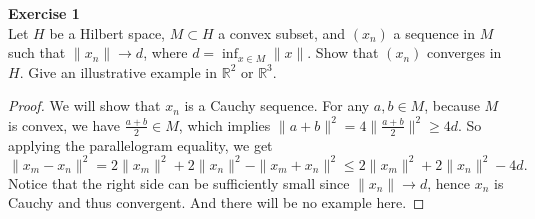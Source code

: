 \documentclass[12pt, a4paper]{article}
\theoremstyle{plain}
\newcommand{\R}{\mathbb{R}}
\newenvironment{exercise}[2][Exercise]
    { \begin{mdframed}[backgroundcolor=gray!20] \textbf{#1 #2} \\}
    {  \end{mdframed}}
\begin{document}
\begin{exercise}{1}
Let $H$ be a Hilbert space, $M\subset H$ a convex subset, and $(x_n)$ a sequence in $M$ such that $\|x_n\|\rightarrow d$, where $d=\inf_{x\in M}\|x\|$. Show that $(x_n)$ converges in $H$. Give an illustrative example in $\R^2$ or $\R^3$.
\end{exercise}
	\begin{proof}
	We will show that $x_n$ is a Cauchy sequence. For any $a,b\in M$, because $M$ is convex, we have $\frac{a+b}{2}\in M$, which implies $\|a+b\|^2= 4\|\frac{a+b}{2}\|^2 \geq 4d$. So applying the parallelogram equality, we get
	\[
	\|x_m-x_n\|^2 = 2\|x_m\|^2+2\|x_n\|^2-\|x_m+x_n\|^2\leq 2\|x_m\|^2+2\|x_n\|^2-4d.
	\]
	Notice that the right side can be sufficiently small since $\|x_n\|\rightarrow d$, hence $x_n$ is Cauchy and thus convergent. And there will be no example here.
	\end{proof}
\end{document}
